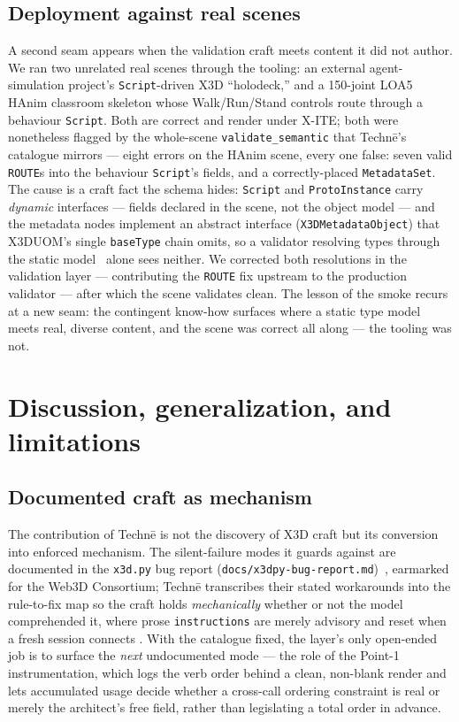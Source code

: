 \documentclass[sigconf,nonacm,screen,anonymous]{acmart}
\begin{document}
\subsection{Deployment against real scenes}

A second seam appears when the validation craft meets content it did not author. We ran two unrelated real scenes through the tooling: an external agent-simulation project's \texttt{Script}-driven X3D ``holodeck,'' and a 150-joint LOA5 HAnim classroom skeleton whose Walk/Run/Stand controls route through a behaviour \texttt{Script}. Both are correct and render under X\nobreakdash-ITE; both were nonetheless flagged by the whole-scene \texttt{validate\_semantic} that Techn\=e's catalogue mirrors --- eight errors on the HAnim scene, every one false: seven valid \texttt{ROUTE}s into the behaviour \texttt{Script}'s fields, and a correctly-placed \texttt{MetadataSet}. The cause is a craft fact the schema hides: \texttt{Script} and \texttt{ProtoInstance} carry \emph{dynamic} interfaces --- fields declared in the scene, not the object model --- and the metadata nodes implement an abstract interface (\texttt{X3DMetadataObject}) that X3DUOM's single \texttt{baseType} chain omits, so a validator resolving types through the static model~\cite{x3duom} alone sees neither. We corrected both resolutions in the validation layer --- contributing the \texttt{ROUTE} fix upstream to the production validator --- after which the scene validates clean. The lesson of the smoke recurs at a new seam: the contingent know-how surfaces where a static type model meets real, diverse content, and the scene was correct all along --- the tooling was not.

\section{Discussion, generalization, and limitations}\label{sec:discussion}

\subsection{Documented craft as mechanism}
The contribution of Technē is not the discovery of X3D craft but its conversion into enforced mechanism. The silent-failure modes it guards against are documented in the \texttt{x3d.py} bug report (\texttt{docs/x3dpy-bug-report.md})~\cite{x3dpy}, earmarked for the Web3D Consortium; Technē transcribes their stated workarounds into the rule-to-fix map so the craft holds \emph{mechanically} whether or not the model comprehended it, where prose \texttt{instructions} are merely advisory and reset when a fresh session connects \cite{baml}. With the catalogue fixed, the layer's only open-ended job is to surface the \emph{next} undocumented mode --- the role of the Point-1 instrumentation, which logs the verb order behind a clean, non-blank render and lets accumulated usage decide whether a cross-call ordering constraint is real or merely the architect's free field, rather than legislating a total order in advance.
\end{document}
